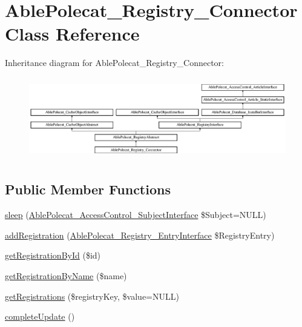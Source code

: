 \hypertarget{class_able_polecat___registry___connector}{}\section{Able\+Polecat\+\_\+\+Registry\+\_\+\+Connector Class Reference}
\label{class_able_polecat___registry___connector}
Inheritance diagram for Able\+Polecat\+\_\+\+Registry\+\_\+\+Connector\+:\begin{figure}[H]
\begin{center}
\leavevmode
\includegraphics[height=3.612903cm]{class_able_polecat___registry___connector}
\end{center}
\end{figure}
\subsection*{Public Member Functions}
\begin{DoxyCompactItemize}
\item 
\hyperlink{class_able_polecat___registry___connector_a365e24d7b066205cafa2a5cce3a4f224}{sleep} (\hyperlink{interface_able_polecat___access_control___subject_interface}{Able\+Polecat\+\_\+\+Access\+Control\+\_\+\+Subject\+Interface} \$Subject=N\+U\+L\+L)
\item 
\hyperlink{class_able_polecat___registry___connector_a22d8ddb551ccf544f1d2615db68ca9b1}{add\+Registration} (\hyperlink{interface_able_polecat___registry___entry_interface}{Able\+Polecat\+\_\+\+Registry\+\_\+\+Entry\+Interface} \$Registry\+Entry)
\item 
\hyperlink{class_able_polecat___registry___connector_a06a999816a4143bb407c09628018a874}{get\+Registration\+By\+Id} (\$id)
\item 
\hyperlink{class_able_polecat___registry___connector_a11594a43c95ab62b4841717c17cf0e54}{get\+Registration\+By\+Name} (\$name)
\item 
\hyperlink{class_able_polecat___registry___connector_a8ed45a29bdb30603896e12d7bbf208b5}{get\+Registrations} (\$registry\+Key, \$value=N\+U\+L\+L)
\item 
\hyperlink{class_able_polecat___registry___connector_a363ee22699ad46520333ef24f64798bb}{complete\+Update} ()
\end{DoxyCompactItemize}
